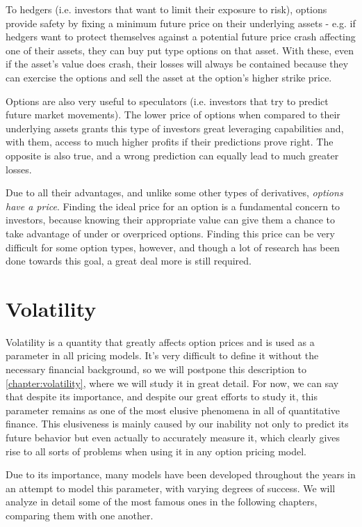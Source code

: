 To hedgers (i.e. investors that want to limit their exposure to risk), options provide safety by fixing a minimum future price on their underlying assets - e.g. if hedgers want to protect themselves against a potential future price crash affecting one of their assets, they can buy put type options on that asset. With these, even if the asset's value does crash, their losses will always be contained because they can exercise the options and sell the asset at the option's higher strike price.

Options are also very useful to speculators (i.e. investors that try to predict future market movements). The lower price of options when compared to their underlying assets grants this type of investors great leveraging capabilities and, with them, access to much higher profits if their predictions prove right. The opposite is also true, and a wrong prediction can equally lead to much greater losses.

Due to all their advantages, and unlike some other types of derivatives, \emph{options have a price}. Finding the ideal price for an option is a fundamental concern to investors, because knowing their appropriate value can give them a chance to take advantage of under or overpriced options.
Finding this price can be very difficult for some option types, however, and though a lot of research has been done towards this goal, a great deal more is still required.


\section{Volatility}
Volatility is a quantity that greatly affects option prices and is used as a parameter in all pricing models. It's very difficult to define it without the necessary financial background, so we will postpone this description to \autoref{chapter:volatility}, where we will study it in great detail.
For now, we can say that despite its importance, and despite our great efforts to study it, this parameter remains as one of the most elusive phenomena in all of quantitative finance. This elusiveness is mainly caused by our inability not only to predict its future behavior but even actually to accurately measure it, which clearly gives rise to all sorts of problems when using it in any option pricing model.

Due to its importance, many models have been developed throughout the years in an attempt to model this parameter, with varying degrees of success. We will analyze in detail some of the most famous ones in the following chapters, comparing them with one another.

